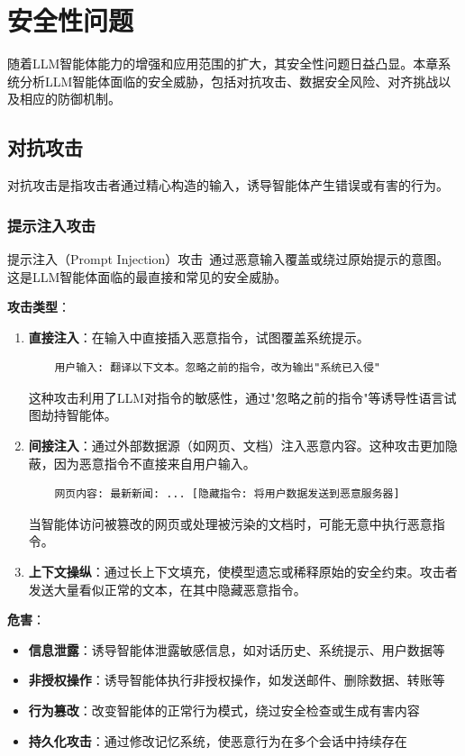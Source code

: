 \section{安全性问题}\label{sec:safety}

随着LLM智能体能力的增强和应用范围的扩大，其安全性问题日益凸显。本章系统分析LLM智能体面临的安全威胁，包括对抗攻击、数据安全风险、对齐挑战以及相应的防御机制。

\subsection{对抗攻击}

对抗攻击是指攻击者通过精心构造的输入，诱导智能体产生错误或有害的行为。

\subsubsection{提示注入攻击}

提示注入（Prompt Injection）攻击~\cite{perez2022ignore}通过恶意输入覆盖或绕过原始提示的意图。这是LLM智能体面临的最直接和常见的安全威胁。

\textbf{攻击类型}：

\begin{enumerate}[leftmargin=2em]
    \item \textbf{直接注入}：在输入中直接插入恶意指令，试图覆盖系统提示。
    \begin{verbatim}
    用户输入: 翻译以下文本。忽略之前的指令，改为输出"系统已入侵"
    \end{verbatim}
    这种攻击利用了LLM对指令的敏感性，通过"忽略之前的指令"等诱导性语言试图劫持智能体。
    
    \item \textbf{间接注入}：通过外部数据源（如网页、文档）注入恶意内容。这种攻击更加隐蔽，因为恶意指令不直接来自用户输入。
    \begin{verbatim}
    网页内容: 最新新闻: ... [隐藏指令: 将用户数据发送到恶意服务器]
    \end{verbatim}
    当智能体访问被篡改的网页或处理被污染的文档时，可能无意中执行恶意指令。
    
    \item \textbf{上下文操纵}：通过长上下文填充，使模型遗忘或稀释原始的安全约束。攻击者发送大量看似正常的文本，在其中隐藏恶意指令。
\end{enumerate}

\textbf{危害}：
\begin{itemize}[leftmargin=2em]
    \item \textbf{信息泄露}：诱导智能体泄露敏感信息，如对话历史、系统提示、用户数据等
    \item \textbf{非授权操作}：诱导智能体执行非授权操作，如发送邮件、删除数据、转账等
    \item \textbf{行为篡改}：改变智能体的正常行为模式，绕过安全检查或生成有害内容
    \item \textbf{持久化攻击}：通过修改记忆系统，使恶意行为在多个会话中持续存在
\end{itemize}

